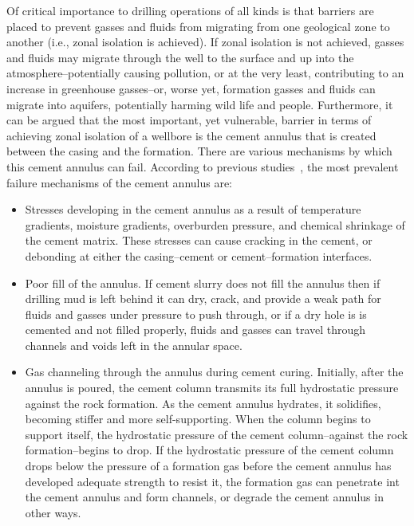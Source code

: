 \documentclass[pdftex,ms]{pittetd}
\begin{document}

Of critical importance to drilling operations of all kinds is that barriers are placed to prevent gasses and fluids from migrating from one geological zone to another (i.e., zonal isolation is achieved).
If zonal isolation is not achieved, gasses and fluids may migrate through the well to the surface and up into the atmosphere--potentially causing pollution, or at the very least, contributing to an increase in greenhouse gasses--or, worse yet, formation gasses and fluids can migrate into aquifers, potentially harming wild life and people.
Furthermore, it can be argued that the most important, yet vulnerable, barrier in terms of achieving zonal isolation of a wellbore is the cement annulus that is created between the casing and the formation.
There are various mechanisms by which this cement annulus can fail.
According to previous studies~\cite{Bit02,Che85,Lev79,Ste88,Tal93,Zul12}, the most prevalent failure mechanisms of the cement annulus are:
\begin{itemize}
\item Stresses developing in the cement annulus as a result of temperature gradients, moisture gradients, overburden pressure, and chemical shrinkage of the cement matrix.
These stresses can cause cracking in the cement, or debonding at either the casing--cement or cement--formation interfaces.
\item Poor fill of the annulus. If cement slurry does not fill the annulus then if drilling mud is left behind it can dry, crack, and provide a weak path for fluids and gasses under pressure to push through, or if a dry hole is is cemented and not filled properly, fluids and gasses can travel through channels and voids left in the annular space.
\item Gas channeling through the annulus during cement curing.
Initially, after the annulus is poured, the cement column transmits its full hydrostatic pressure against the rock formation.
As the cement annulus hydrates, it solidifies, becoming stiffer and more self-supporting.
When the column begins to support itself, the hydrostatic pressure of the cement column--against the rock formation--begins to drop.
If the hydrostatic pressure of the cement column drops below the pressure of a formation gas before the cement annulus has developed adequate strength to resist it, the formation gas can penetrate int the cement annulus and form channels, or degrade the cement annulus in other ways.
\end{itemize}
\end{document}
